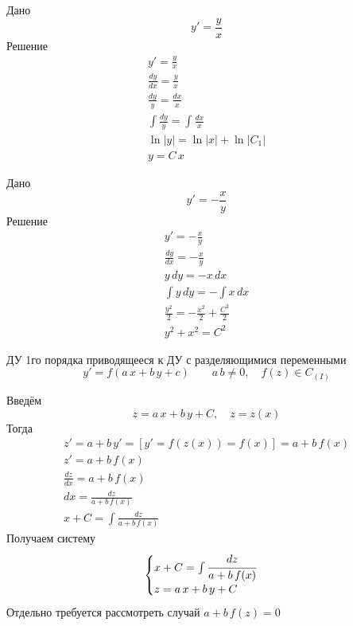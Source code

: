 \begin{Example}
    Дано
    \[
        y' = \frac{y}{x}
    \]
    Решение
    \begin{gather*}
        y' = \frac{y}{x}\\
        \frac{dy}{dx} = \frac{y}{x}\\
        \frac{dy}{y} = \frac{dx}{x}\\
        \int \frac{dy}{y} = \int \frac{dx}{x}\\
        \ln|y| = \ln|x| + \ln|C_1|\\
        y = C\,x
    \end{gather*}
\end{Example}

\begin{Example}
    Дано
    \[
        y' = -\frac{x}{y}
    \]
    Решение
    \begin{gather*}  
        y' = -\frac{x}{y}\\
        \frac{dy}{dx} = -\frac{x}{y}\\
        y\,dy = -x\,dx\\
        \int y\,dy = - \int x\,dx \\
        \frac{y^2}{2} = - \frac{x^2}{2} + \frac{C^2}{2}\\
        y^2 + x^2 = C^2
    \end{gather*}
\end{Example}

\begin{Def}
    ДУ 1го порядка приводящееся к ДУ с разделяющимися переменными
    \[
        y' = f(a\,x + b\,y + c) \qquad a\,b \neq 0, \quad f(z) \in C_{(I)}
    \]
\end{Def}

\begin{Note}
    Введём 
    \[
        z = a\,x + b\,y + C, \quad z = z(x)
    \]
    Тогда
    \begin{gather*}
        z' = a + b\,y' = [y' = f(z(x)) = f(x)] =  a + b\,f(x)\\
        z' = a + b\,f(x)\\
        \frac{dz}{dx} = a + b\,f(x)\\
        dx = \frac{dz}{a + b\,f(x)}\\
        x + C = \int \frac{dz}{a + b\,f(x)}
    \end{gather*}
    Получаем систему
    \[
        \begin{cases}
            x + C = \int \cfrac{dz}{a + b\,f(x)}\\
            z = a\,x + b\,y + C
        \end{cases}
    \]
    Отдельно требуется рассмотреть случай $a + b\,f(z) = 0$
\end{Note}

